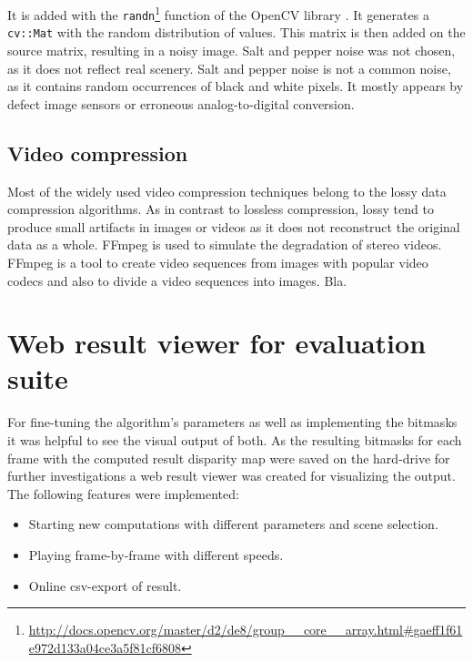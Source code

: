 \noindent It is added with the \texttt{randn}\footnote{\url{http://docs.opencv.org/master/d2/de8/group__core__array.html\#gaeff1f61e972d133a04ce3a5f81cf6808}} function of the OpenCV library \citep{opencv_library}.
It generates a \texttt{cv::Mat} with the random distribution of values.
This matrix is then added on the source matrix, resulting in a noisy image.
Salt and pepper noise was not chosen, as it does not reflect real scenery.
Salt and pepper noise is not a common noise, as it contains random occurrences of black and white pixels.
It mostly appears by defect image sensors or erroneous analog-to-digital conversion.

\subsection*{Video compression}

Most of the widely used video compression techniques belong to the lossy data compression algorithms.
As in contrast to lossless compression, lossy tend to produce small artifacts in images or videos as it does not reconstruct the original data as a whole.
FFmpeg \citep{FFMPEG2010} is used to simulate the degradation of stereo videos.
FFmpeg is a tool to create video sequences from images with popular video codecs and also to divide a video sequences into images.
\newline\newline\noindent Bla.

\section{Web result viewer for evaluation suite}

For fine-tuning the algorithm's parameters as well as implementing the bitmasks it was helpful to see the visual output of both.
As the resulting bitmasks for each frame with the computed result disparity map were saved on the hard-drive for further investigations a web result viewer was created for visualizing the output.
The following features were implemented:
\begin{itemize}
  \item Starting new computations with different parameters and scene selection.
  \item Playing frame-by-frame with different speeds.
  \item Online csv-export of result.
\end{itemize}

